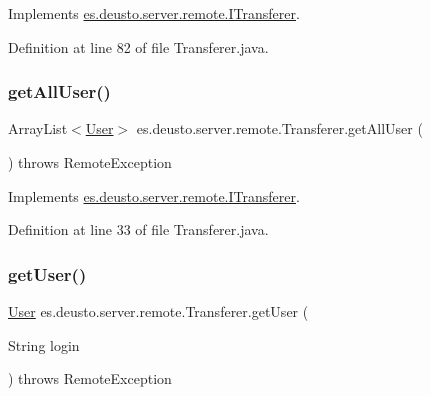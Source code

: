 Implements \hyperlink{interfacees_1_1deusto_1_1server_1_1remote_1_1_i_transferer_a71afa6799122b3f09805f86d2e58fc23}{es.\+deusto.\+server.\+remote.\+I\+Transferer}.



Definition at line 82 of file Transferer.\+java.

\mbox{\label{classes_1_1deusto_1_1server_1_1remote_1_1_transferer_a613c0c3af149140e58488ce9d0745593}} 
\subsubsection{\texorpdfstring{get\+All\+User()}{getAllUser()}}
{\footnotesize\ttfamily Array\+List$<$\hyperlink{classes_1_1deusto_1_1server_1_1db_1_1data_1_1_user}{User}$>$ es.\+deusto.\+server.\+remote.\+Transferer.\+get\+All\+User (\begin{DoxyParamCaption}{ }\end{DoxyParamCaption}) throws Remote\+Exception}



Implements \hyperlink{interfacees_1_1deusto_1_1server_1_1remote_1_1_i_transferer_aec6609427d773f075a78295a97888103}{es.\+deusto.\+server.\+remote.\+I\+Transferer}.



Definition at line 33 of file Transferer.\+java.

\mbox{\label{classes_1_1deusto_1_1server_1_1remote_1_1_transferer_a16976959aeb3080244422aeac061a23b}} 
\subsubsection{\texorpdfstring{get\+User()}{getUser()}}
{\footnotesize\ttfamily \hyperlink{classes_1_1deusto_1_1server_1_1db_1_1data_1_1_user}{User} es.\+deusto.\+server.\+remote.\+Transferer.\+get\+User (\begin{DoxyParamCaption}\item[{String}]{login }\end{DoxyParamCaption}) throws Remote\+Exception}



